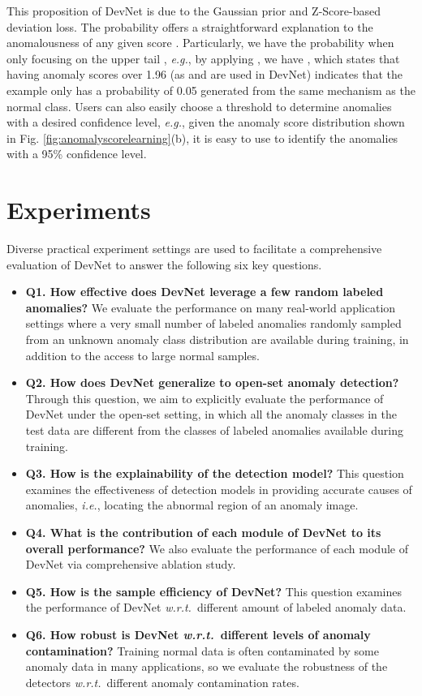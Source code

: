 \documentclass[10pt,journal,compsoc]{IEEEtran}
\newcommand{\ie}{\textit{i.e.}}
\begin{document}
This proposition of DevNet is due to the Gaussian prior and Z-Score-based deviation loss. The probability  offers a straightforward explanation to the anomalousness of any given score . Particularly, we have the probability  when only focusing on the upper tail , \textit{e.g.}, by applying , we have , which states that having anomaly scores over 1.96 (as  and  are used in DevNet) indicates that the example only has a probability of 0.05 generated from the same mechanism as the normal class. Users can also easily choose a threshold to determine anomalies with a desired confidence level, \textit{e.g.}, given the anomaly score distribution shown in Fig. \ref{fig:anomalyscorelearning}(b), it is easy to use  to identify the anomalies with a 95\% confidence level.

\section{Experiments}


Diverse practical experiment settings are used to facilitate a comprehensive evaluation of DevNet to answer the following six key questions.

\begin{itemize}
    \item \textbf{Q1. How effective does DevNet leverage a few random labeled anomalies?} We evaluate the performance on many real-world application settings where a very small number of labeled anomalies randomly sampled from an unknown anomaly class distribution are available during training, in addition to the access to large normal samples.
    \item \textbf{Q2. How does DevNet generalize to open-set anomaly detection?} Through this question, we aim to explicitly evaluate the performance of DevNet under the open-set setting, in which all the anomaly classes in the test data are different from the classes of labeled anomalies available during training. 
    \item \textbf{Q3. How is the explainability of the detection model?} This question examines the effectiveness of detection models in providing accurate causes of anomalies, \ie, locating the abnormal region of an anomaly image.
    \item \textbf{Q4. What is the contribution of each module of DevNet to its overall performance?} We also evaluate the performance of each module of DevNet via comprehensive ablation study.
    \item \textbf{Q5. How is the sample efficiency of DevNet?} This question examines the performance of DevNet \textit{w.r.t.}\  different amount of labeled anomaly data.
    \item \textbf{Q6. How robust is DevNet \textit{w.r.t.}\  different levels of anomaly contamination?} Training normal data is often contaminated by some anomaly data in many applications, so we evaluate the robustness of the detectors \textit{w.r.t.}\  different anomaly contamination rates.
\end{itemize}
\end{document}
